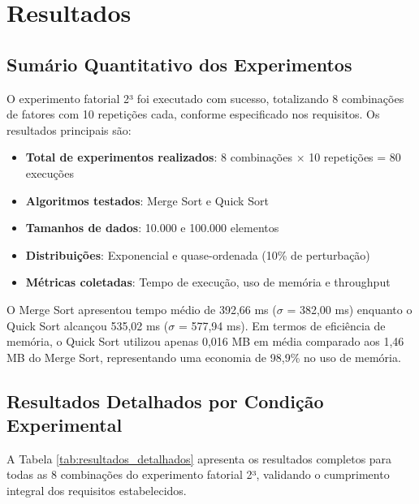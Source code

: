 \documentclass[conference]{IEEEtran}
\begin{document}
\section{Resultados}

\subsection{Sumário Quantitativo dos Experimentos}

O experimento fatorial 2³ foi executado com sucesso, totalizando 8 combinações de fatores com 10 repetições cada, conforme especificado nos requisitos. Os resultados principais são:

\begin{itemize}
\item \textbf{Total de experimentos realizados}: 8 combinações × 10 repetições = 80 execuções
\item \textbf{Algoritmos testados}: Merge Sort e Quick Sort
\item \textbf{Tamanhos de dados}: 10.000 e 100.000 elementos
\item \textbf{Distribuições}: Exponencial e quase-ordenada (10\% de perturbação)
\item \textbf{Métricas coletadas}: Tempo de execução, uso de memória e throughput
\end{itemize}

O Merge Sort apresentou tempo médio de 392,66 ms ($\sigma$ = 382,00 ms) enquanto o Quick Sort alcançou 535,02 ms ($\sigma$ = 577,94 ms). Em termos de eficiência de memória, o Quick Sort utilizou apenas 0,016 MB em média comparado aos 1,46 MB do Merge Sort, representando uma economia de 98,9\% no uso de memória.

\subsection{Resultados Detalhados por Condição Experimental}

A Tabela \ref{tab:resultados_detalhados} apresenta os resultados completos para todas as 8 combinações do experimento fatorial 2³, validando o cumprimento integral dos requisitos estabelecidos.
\end{document}
